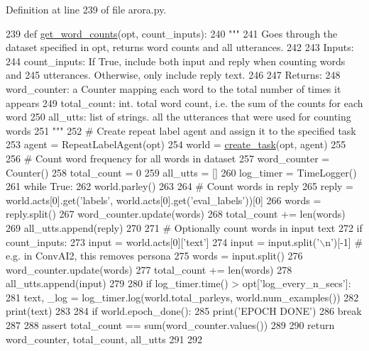 Definition at line 239 of file arora.\+py.


\begin{DoxyCode}
239 \textcolor{keyword}{def }\hyperlink{namespaceprojects_1_1controllable__dialogue_1_1controllable__seq2seq_1_1arora_a2a5256a5d5666134bc2a89b0fe831fcd}{get\_word\_counts}(opt, count\_inputs):
240     \textcolor{stringliteral}{"""}
241 \textcolor{stringliteral}{    Goes through the dataset specified in opt, returns word counts and all utterances.}
242 \textcolor{stringliteral}{}
243 \textcolor{stringliteral}{    Inputs:}
244 \textcolor{stringliteral}{      count\_inputs: If True, include both input and reply when counting words and}
245 \textcolor{stringliteral}{        utterances. Otherwise, only include reply text.}
246 \textcolor{stringliteral}{}
247 \textcolor{stringliteral}{    Returns:}
248 \textcolor{stringliteral}{      word\_counter: a Counter mapping each word to the total number of times it appears}
249 \textcolor{stringliteral}{      total\_count: int. total word count, i.e. the sum of the counts for each word}
250 \textcolor{stringliteral}{      all\_utts: list of strings. all the utterances that were used for counting words}
251 \textcolor{stringliteral}{    """}
252     \textcolor{comment}{# Create repeat label agent and assign it to the specified task}
253     agent = RepeatLabelAgent(opt)
254     world = \hyperlink{namespaceparlai_1_1core_1_1worlds_a79969c7ba76d4b3c500f5bb776444dc6}{create\_task}(opt, agent)
255 
256     \textcolor{comment}{# Count word frequency for all words in dataset}
257     word\_counter = Counter()
258     total\_count = 0
259     all\_utts = []
260     log\_timer = TimeLogger()
261     \textcolor{keywordflow}{while} \textcolor{keyword}{True}:
262         world.parley()
263 
264         \textcolor{comment}{# Count words in reply}
265         reply = world.acts[0].get(\textcolor{stringliteral}{'labels'}, world.acts[0].get(\textcolor{stringliteral}{'eval\_labels'}))[0]
266         words = reply.split()
267         word\_counter.update(words)
268         total\_count += len(words)
269         all\_utts.append(reply)
270 
271         \textcolor{comment}{# Optionally count words in input text}
272         \textcolor{keywordflow}{if} count\_inputs:
273             input = world.acts[0][\textcolor{stringliteral}{'text'}]
274             input = input.split(\textcolor{stringliteral}{'\(\backslash\)n'})[-1]  \textcolor{comment}{# e.g. in ConvAI2, this removes persona}
275             words = input.split()
276             word\_counter.update(words)
277             total\_count += len(words)
278             all\_utts.append(input)
279 
280         \textcolor{keywordflow}{if} log\_timer.time() > opt[\textcolor{stringliteral}{'log\_every\_n\_secs'}]:
281             text, \_log = log\_timer.log(world.total\_parleys, world.num\_examples())
282             print(text)
283 
284         \textcolor{keywordflow}{if} world.epoch\_done():
285             print(\textcolor{stringliteral}{'EPOCH DONE'})
286             \textcolor{keywordflow}{break}
287 
288     \textcolor{keyword}{assert} total\_count == sum(word\_counter.values())
289 
290     \textcolor{keywordflow}{return} word\_counter, total\_count, all\_utts
291 
292 
\end{DoxyCode}
